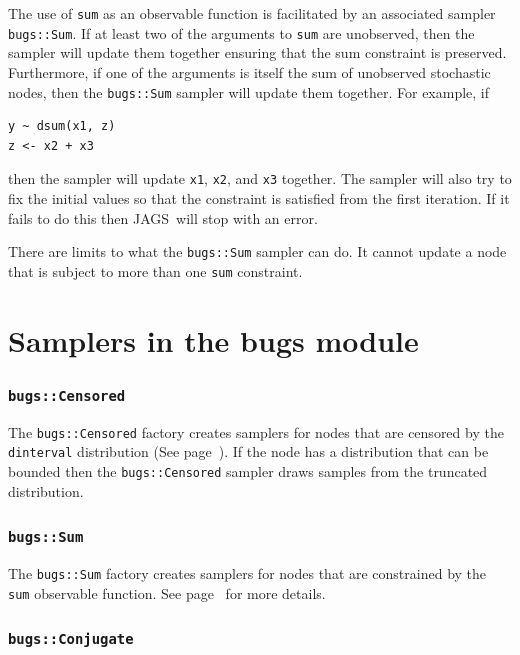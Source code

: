 \documentclass[11pt, a4paper, titlepage]{report}
\newcommand{\JAGS}{\textsf{JAGS}}
\begin{document}
{The use of \texttt{sum} as an observable function is facilitated by an
associated sampler \texttt{bugs::Sum}. If at least two of the
arguments to \texttt{sum} are unobserved, then the sampler will update
them together ensuring that the sum constraint is preserved.
Furthermore, if one of the arguments is itself the sum of unobserved
stochastic nodes, then the \texttt{bugs::Sum} sampler will update them
together. For example, if
\begin{verbatim}
y ~ dsum(x1, z)
z <- x2 + x3
\end{verbatim}
then the sampler will update {\tt x1}, {\tt x2}, and {\tt x3}
together. The sampler will also try to fix the initial values so that
the constraint is satisfied from the first iteration. If it fails to
do this then \JAGS\ will stop with an error.

There are limits to what the \texttt{bugs::Sum} sampler can do. It
cannot update a node that is subject to more than one \texttt{sum}
constraint.

\section{Samplers in the bugs module}


\subsubsection{\texttt{bugs::Censored}}

The \texttt{bugs::Censored} factory creates samplers for nodes that
are censored by the \texttt{dinterval} distribution (See
page~\pageref{bugs:dinterval}). If the node has a distribution that can be
bounded then the \texttt{bugs::Censored} sampler draws samples from
the truncated distribution.

\subsubsection{\texttt{bugs::Sum}}

The \texttt{bugs::Sum} factory creates samplers for nodes that are
constrained by the \texttt{sum} observable function. See
page~\pageref{bugs:sum} for more details.

\subsubsection{\texttt{bugs::Conjugate}}

}
\end{document}
